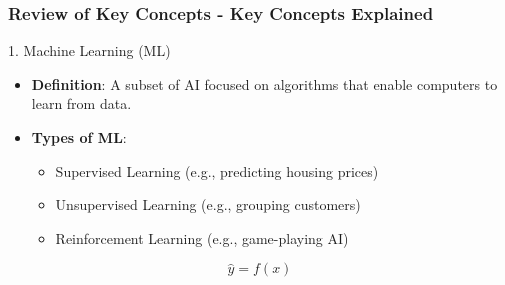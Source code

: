\documentclass[aspectratio=169]{beamer}
\begin{document}
\begin{frame}[fragile]
  \frametitle{Review of Key Concepts - Key Concepts Explained}
  \begin{block}{1. Machine Learning (ML)}
    \begin{itemize}
      \item \textbf{Definition}: A subset of AI focused on algorithms that enable computers to learn from data.
      \item \textbf{Types of ML}:
      \begin{itemize}
        \item Supervised Learning (e.g., predicting housing prices)
        \item Unsupervised Learning (e.g., grouping customers)
        \item Reinforcement Learning (e.g., game-playing AI)
      \end{itemize}
    \end{itemize}
    \begin{equation}
      \hat{y} = f(x)
    \end{equation}
  \end{block}
\end{frame}
\end{document}
